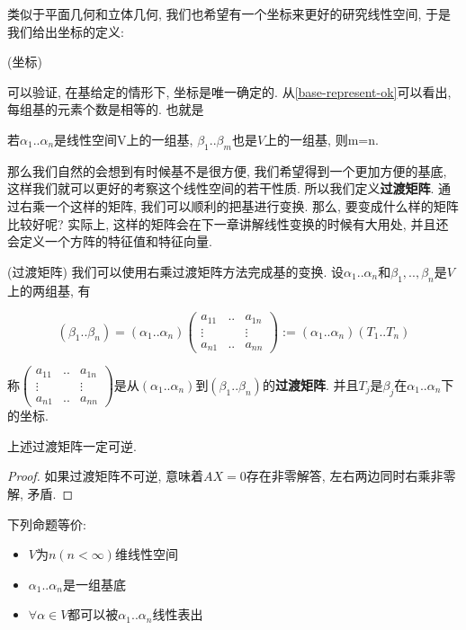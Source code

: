 类似于平面几何和立体几何, 我们也希望有一个坐标来更好的研究线性空间, 于是我们给出坐标的定义:
\begin{defn}
(坐标)
\end{defn}
可以验证, 在基给定的情形下, 坐标是唯一确定的. 从\ref{base-represent-ok}可以看出, 每组基的元素个数是相等的.
也就是
\begin{thm}
若$\alpha_{1}..\alpha_{n}$是线性空间V上的一组基, $\beta_{1}..\beta_{m}$也是$V$上的一组基,
则m=n. 
\end{thm}
那么我们自然的会想到有时候基不是很方便, 我们希望得到一个更加方便的基底, 这样我们就可以更好的考察这个线性空间的若干性质. 所以我们定义\textbf{过渡矩阵}.
通过右乘一个这样的矩阵, 我们可以顺利的把基进行变换. 那么, 要变成什么样的矩阵比较好呢? 实际上, 这样的矩阵会在下一章讲解线性变换的时候有大用处,
并且还会定义一个方阵的特征值和特征向量. 
\begin{defn}
(过渡矩阵) 我们可以使用右乘过渡矩阵方法完成基的变换. 设$\alpha_{1}..\alpha_{n}$和$\beta_{1},..,\beta_{n}$是$V$上的两组基,
有 

\[
\left(\beta_{1}..\beta_{n}\right)=\left(\alpha_{1}..\alpha_{n}\right)\begin{pmatrix}a_{11} & .. & a_{1n}\\
\vdots &  & \vdots\\
a_{n1} & .. & a_{nn}
\end{pmatrix}:=\left(\alpha_{1}..\alpha_{n}\right)\left(T_{1}..T_{n}\right)
\]

称$\begin{pmatrix}a_{11} & .. & a_{1n}\\
\vdots &  & \vdots\\
a_{n1} & .. & a_{nn}
\end{pmatrix}$是从$\left(\alpha_{1}..\alpha_{n}\right)$到$\left(\beta_{1}..\beta_{n}\right)$的\textbf{过渡矩阵}.
并且$T_{j}$是$\beta_{j}$在$\alpha_{1}..\alpha_{n}$下的坐标. 
\end{defn}
\begin{thm}
上述过渡矩阵一定可逆. 
\end{thm}
\begin{proof}
如果过渡矩阵不可逆, 意味着$AX=0$存在非零解答, 左右两边同时右乘非零解, 矛盾. 
\end{proof}
\begin{lem}
下列命题等价:
\begin{itemize}
\item $V$为$n(n<\infty)$维线性空间
\item $\alpha_{1}..\alpha_{n}$是一组基底
\item $\forall\alpha\in V$都可以被$\alpha_{1}..\alpha_{n}$线性表出
\end{itemize}
\end{lem}
